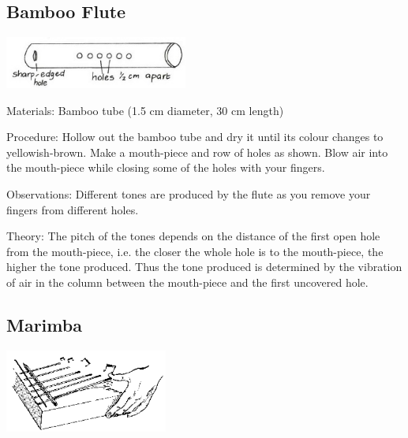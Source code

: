 \begin{multicols}{2}
\subsection{Bamboo Flute}

\begin{center}
\includegraphics[width=0.45\textwidth]{./img/vso/bamboo-flute.jpg}
\end{center}

\begin{description*}
\item[Materials:]{Bamboo tube (1.5 cm diameter, 30 cm length)}
\item[Procedure:]{Hollow out the bamboo tube and dry it until its colour changes to yellowish-brown. Make a mouth-piece and row of holes as shown. Blow air into the mouth-piece while closing some of the holes with your fingers.}
\item[Observations:]{Different tones are produced by the flute as you remove your fingers from different holes.}
\item[Theory:]{The pitch of the tones depends on the distance of the first open hole from the mouth-piece, i.e. the closer the whole hole is to the mouth-piece, the higher the tone produced. Thus the tone produced is determined by the vibration of air in the column between the mouth-piece and the first uncovered hole.}
\end{description*}

\columnbreak

\subsection{Marimba}

\begin{center}
\includegraphics[width=0.4\textwidth]{./img/source/marimba.png}
\end{center}


\end{multicols}
